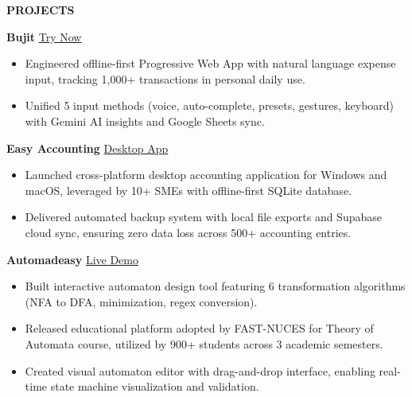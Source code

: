 \documentclass{resume} %
\newcommand{\largeSection}[1]{\textbf{\Large #1}}
\begin{document}

\begin{rSection}{\largeSection{PROJECTS}}

\textbf{Bujit} \hfill \href{https://bujit.lovable.app}{Try Now} %
\begin{itemize}
    \itemsep -3pt {}
    \item Engineered offline-first Progressive Web App with natural language expense input, tracking 1,000+ transactions in personal daily use.
    \item Unified 5 input methods (voice, auto-complete, presets, gestures, keyboard) with Gemini AI insights and Google Sheets sync.
\end{itemize}

\textbf{Easy Accounting} \hfill \href{https://github.com/anserwaseem/easy-accounting/releases}{Desktop App}
\begin{itemize}
    \itemsep -3pt {}
    \item Launched cross-platform desktop accounting application for Windows and macOS, leveraged by 10+ SMEs with offline-first SQLite database.
    \item Delivered automated backup system with local file exports and Supabase cloud sync, ensuring zero data loss across 500+ accounting entries.
\end{itemize}

\textbf{Automadeasy} \hfill \href{https://automadeasy.vercel.app}{Live Demo}
\begin{itemize}
    \itemsep -3pt {}
    \item Built interactive automaton design tool featuring 6 transformation algorithms (NFA to DFA, minimization, regex conversion).
    \item Released educational platform adopted by FAST-NUCES for Theory of Automata course, utilized by 900+ students across 3 academic semesters.
    \item Created visual automaton editor with drag-and-drop interface, enabling real-time state machine visualization and validation.
\end{itemize}

\end{rSection}

\end{document}
